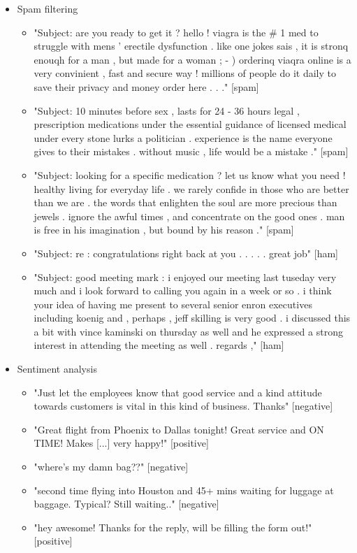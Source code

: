 \documentclass{article}
\theoremstyle{definition}
\theoremstyle{remark}
\begin{document}
\begin{enumerate}
\begin{itemize}
        \item Spam filtering \begin{itemize}
            \item "Subject: are you ready to get it ?  hello !  viagra is the # 1 med to struggle with mens ' erectile dysfunction .  like one jokes sais , it is stronq enouqh for a man , but made for a woman ; - )  orderinq viaqra online is a very convinient , fast and secure way !  millions of people do it daily to save their privacy and money  order here . . ." [spam]
            \item "Subject: 10 minutes before sex , lasts for 24 - 36 hours  legal , prescription medications under the essential guidance of licensed medical  under every stone lurks a politician .  experience is the name everyone gives to their mistakes .  without music , life would be a mistake ." [spam]
            \item "Subject: looking for a specific medication ? let us know what you need !  healthy living for everyday life .  we rarely confide in those who are better than we are .  the words that enlighten the soul are more precious than jewels .  ignore the awful times , and concentrate on the good ones .  man is free in his imagination , but bound by his reason ." [spam]
            \item "Subject: re : congratulations  right back at you . . . . . great job" [ham]
            \item "Subject: good meeting  mark :  i enjoyed our meeting last tuseday very much and i look forward to calling  you again in a week or so . i think your idea of having me present to several  senior enron executives including koenig and , perhaps , jeff skilling is very  good .  i discussed this a bit with vince kaminski on thursday as well and he  expressed a strong interest in attending the meeting as well .  regards ," [ham]
        \end{itemize}
        \item Sentiment analysis \begin{itemize}
            \item "Just let the employees know that good service and a kind attitude towards customers is vital in this kind of business. Thanks" [negative]
            \item "Great flight from Phoenix to Dallas tonight! Great service and ON TIME! Makes [...] very happy!" [positive]
            \item "where's my damn bag??" [negative]
            \item "second time flying into Houston and 45+ mins waiting for luggage at baggage. Typical? Still waiting.." [negative]
            \item "hey awesome!  Thanks for the reply, will be filling the form out!" [positive]
        \end{itemize}
    \end{itemize}
\end{enumerate}
\end{document}
